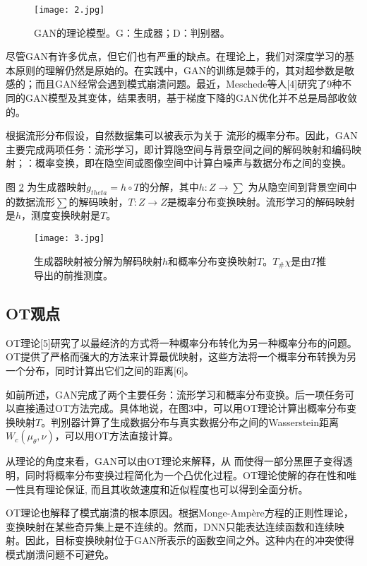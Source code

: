 \begin{figure}[h]
	\centering
	\texttt{[image: 2.jpg]}
	\caption{GAN的理论模型。G：生成器；D：判别器。}
	\label{fig:2}
\end{figure}

尽管GAN有许多优点，但它们也有严重的缺点。在理论上，我们对深度学习的基本原则的理解仍然是原始的。在实践中，GAN的训练是棘手的，其对超参数是敏感的；而且GAN经常会遇到模式崩溃问题。最近，Meschede等人[4]研究了9种不同的GAN模型及其变体，结果表明，基于梯度下降的GAN优化并不总是局部收敛的。

根据流形分布假设，自然数据集可以被表示为关于
流形的概率分布。因此，GAN主要完成两项任务：流形学习，即计算隐空间与背景空间之间的解码映射和编码映射；：概率变换，即在隐空间或图像空间中计算白噪声与数据分布之间的变换。

图 \ref{fig:3} 为生成器映射$g_{theta}=ℎ \circ T$的分解，其中$h: Z \to \sum$ 为从隐空间到背景空间中的数据流形$\sum$的解码映射，$T: Z\to Z$是概率分布变换映射。流形学习的解码映射是$h$，测度变换映射是$T$。

\begin{figure}[h]
	\centering
	\texttt{[image: 3.jpg]}
	\caption{生成器映射被分解为解码映射$h$和概率分布变换映射$T$。$T_{\#}\chi$是由$T$推导出的前推测度。
	}
	\label{fig:3}
\end{figure}

\subsection{OT观点}

OT理论[5]研究了以最经济的方式将一种概率分布转化为另一种概率分布的问题。OT提供了严格而强大的方法来计算最优映射，这些方法将一个概率分布转换为另一个分布，同时计算出它们之间的距离[6]。

如前所述，GAN完成了两个主要任务：流形学习和概率分布变换。后一项任务可以直接通过OT方法完成。具体地说，在图3中，可以用OT理论计算出概率分布变换映射$T$。判别器计算了生成数据分布与真实数据分布之间的Wasserstein距离$W_c(\mu_{\theta},\nu)$，可以用OT方法直接计算。

从理论的角度来看，GAN可以由OT理论来解释，从
而使得一部分黑匣子变得透明，同时将概率分布变换过程简化为一个凸优化过程。OT理论使解的存在性和唯一性具有理论保证, 而且其收敛速度和近似程度也可以得到全面分析。

OT理论也解释了模式崩溃的根本原因。根据Monge-Ampère方程的正则性理论，变换映射在某些奇异集上是不连续的。然而，DNN只能表达连续函数和连续映射。因此，目标变换映射位于GAN所表示的函数空间之外。这种内在的冲突使得模式崩溃问题不可避免。

